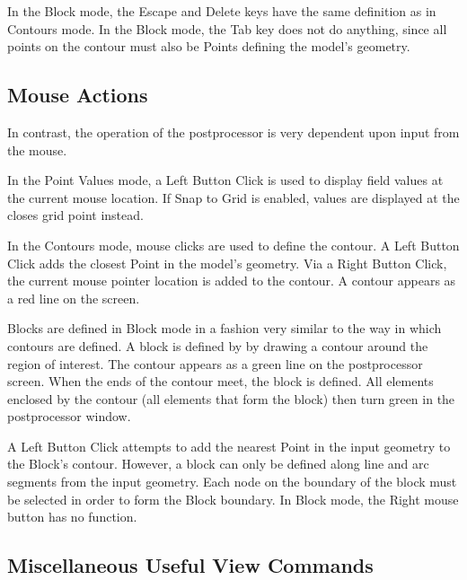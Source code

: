 \documentclass[12pt]{report}
\begin{document}
In the Block mode, the Escape and Delete keys have the same
definition as in Contours mode.  In the Block mode, the Tab key
does not do anything, since all points on the contour must also be
Points defining the model's geometry.

\subsection{Mouse Actions}

In contrast, the operation of the postprocessor is very dependent
upon input from the mouse.

In the Point Values mode, a Left Button Click is used to display
field values at the current mouse location.  If Snap to Grid is
enabled, values are displayed at the closes grid point instead.

In the Contours mode, mouse clicks are used to define the contour.
A Left Button Click adds the closest Point in the model's geometry.
Via a Right Button Click, the current mouse pointer location is
added to the contour.  A contour appears as a red line on the
screen.

Blocks are defined in Block mode in a fashion very similar to the
way in which contours are defined.  A block is defined by by
drawing a contour around the region of interest.  The contour
appears as a green line on the postprocessor screen.  When the ends
of the contour meet, the block is defined.  All elements enclosed
by the contour (all elements that form the block) then turn green
in the postprocessor window.

A Left Button Click attempts to add the nearest Point in the input
geometry to the Block's contour.  However, a block can only be
defined along line and arc segments from the input geometry.  Each
node on the boundary of the block must be selected in order to form
the Block boundary.  In Block mode, the Right mouse button has no
function.

\subsection{Miscellaneous Useful View Commands} \label{scissors}
\end{document}
